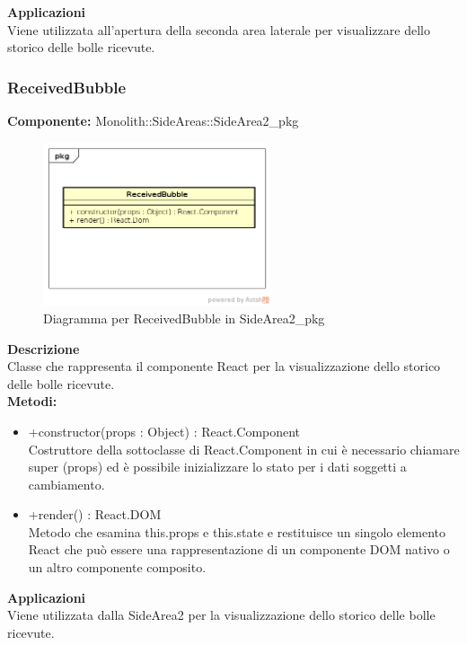 \textbf{Applicazioni}\\
Viene utilizzata all'apertura della seconda area laterale per visualizzare dello storico delle bolle ricevute. 


\clearpage

\subsubsection{ReceivedBubble}
\textbf{Componente:}  Monolith::SideAreas::SideArea2\_pkg\\
   \FloatBarrier
   \begin{figure}[ht]
   \centering
   \includegraphics[width=0.6\textwidth]{img/single-ReceivedBubble.png}
   \caption{{Diagramma per ReceivedBubble in SideArea2\_pkg}}
\end{figure}
\FloatBarrier
\textbf{Descrizione}\\
Classe che rappresenta il componente React per la visualizzazione dello storico delle bolle ricevute. \\
\textbf{Metodi:} 
\begin{itemize}
\item +constructor(props : Object) : React.Component 
\\
Costruttore della sottoclasse di React.Component in cui è necessario chiamare super (props) ed è possibile inizializzare lo stato per i dati soggetti a cambiamento.
\item +render() : React.DOM 
\\
Metodo che esamina this.props e this.state e restituisce un singolo elemento React che può essere una rappresentazione di un componente DOM nativo o un altro componente composito.
\end{itemize} 


\textbf{Applicazioni}\\
Viene utilizzata dalla SideArea2 per la visualizzazione dello storico delle bolle ricevute. 


\clearpage

